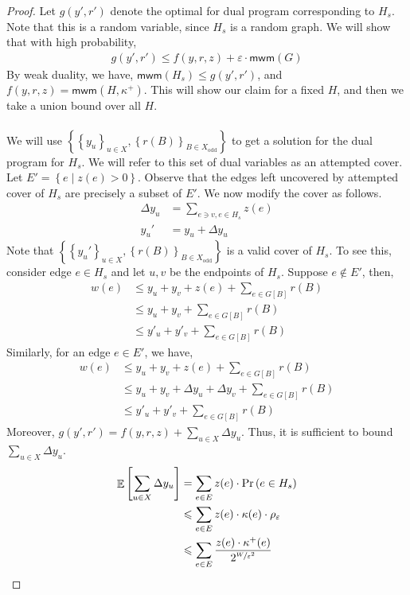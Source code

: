 \documentclass[a4paper,11pt]{article}
\DeclareMathOperator*{\Exp}{\ensuremath{{\mathbb{E}}}}
\DeclareMathOperator*{\Prob}{\ensuremath{\textnormal{Pr}}}
\renewcommand{\Pr}{\Prob}
\newcommand{\prob}[1]{\Pr\paren{#1}}
\newcommand{\paren}[1]{\left ( #1 \right )}
\newcommand{\bracket}[1]{\left [ #1 \right ]}
\newcommand{\expect}[1]{\Exp\bracket{#1}}
\newcommand{\set}[1]{\ensuremath{\left\{ #1 \right\}}}
\newcommand{\eps}{\varepsilon}
\theoremstyle{definition}
\theoremstyle{definition}
\theoremstyle{definition}
\theoremstyle{definition}
\theoremstyle{definition}
\theoremstyle{definition}
\theoremstyle{definition}
\theoremstyle{definition}
\theoremstyle{definition}
\theoremstyle{definition}
\theoremstyle{definition}
\theoremstyle{definition}
\theoremstyle{definition}
\theoremstyle{definition}
\theoremstyle{definition}
\begin{document}
\begin{proof}
Let $g(y',r')$ denote the optimal for dual program corresponding to $H_s$. Note that this is a random variable, since $H_s$ is a random graph. We will show that with high probability,
\begin{align*}
g(y',r')\leqslant f(y,r,z)+\varepsilon\cdot \textsf{mwm}(G)
\end{align*}
By weak duality, we have, $\textsf{mwm}(H_s)\leqslant g(y',r')$, and $f(y,r,z)=\textsf{mwm}(H,\kappa^+)$. This will show our claim for a fixed $H$, and then we take a union bound over all $H$.\\ \\
We will use $\set{\set{y_{u}}_{u\in X}, \set{r(B)}_{B\in X_{\text{odd}}}}$ to get a solution for the dual program for $H_s$. We will refer to this set of dual variables as an attempted cover. Let $E'=\set{e\mid z(e)>0}$. Observe that the edges left uncovered by attempted cover of $H_s$ are precisely a subset of $E'$. We now modify the cover as follows.
\begin{align*}
\Delta y_u&=\sum_{e\ni v,e\in H_s} z(e)\\
y_u'&=y_u+\Delta y_u
\end{align*}
Note that $\set{\set{y_u'}_{u\in X}, \set{r(B)}_{B\in X_{\text{odd}}}}$ is a valid cover of $H_s$. To see this, consider edge $e\in H_s$ and let $u,v$ be the endpoints of $H_s$. Suppose $e\notin E'$, then, 
\begin{align*}
w(e)&\leqslant y_u+y_v+z(e)+\sum_{e\in G[B]} r(B)\\
&\leqslant y_u+y_v+\sum_{e\in G[B]} r(B)\\
&\leqslant y'_u+y'_v+\sum_{e\in G[B]} r(B)
\end{align*}
Similarly, for an edge $e\in E'$, we have,
\begin{align*}
w(e)&\leqslant y_u+y_v+z(e)+\sum_{e\in G[B]} r(B)\\
&\leqslant y_u+y_v+\Delta y_u+\Delta y_v+\sum_{e\in G[B]} r(B)\\
&\leqslant y'_u+y'_v+\sum_{e\in G[B]} r(B)
\end{align*}
Moreover, $g(y',r')=f(y,r,z)+\sum_{u\in X} \Delta y_u$. Thus, it is sufficient to bound $\sum_{u\in X}\Delta y_u$.
\begin{align*}
\expect{\sum_{u\in X}\Delta y_{u}}&=\sum_{e\in E} z(e)\cdot \prob{e\in H_s}\\
&\leqslant \sum_{e\in E} z(e)\cdot \kappa(e)\cdot \rho_{\eps}\\
						   &\leqslant \sum_{e\in E} \frac{z(e)\cdot \kappa^{+}(e)}{2^{\nicefrac{W}{\eps^2}}}\\

\end{align*}
\end{proof}
\end{document}
